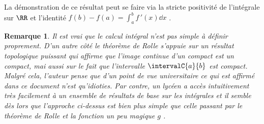 \documentclass[12pt]{amsart}
\newtheorem*{remark*}{Remarque}
\begin{document}
La démonstration de ce résultat peut se faire via la stricte positivité de l'intégrale sur $\RR$ et l'identité $f(b) - f(a) = \int_a^b f\,'(x) \dd{x}$ .


\begin{remark*}
	Il est vrai que le calcul intégral n'est pas simple à définir proprement.
	D'un autre côté le théorème de Rolle s'appuie sur un résultat topologique puissant qui affirme que l'image continue d'un compact est un compact, mai aussi sur le fait que l'intervalle $\intervalC{a}{b}$ est compact.
	Malgré cela, l'auteur pense que d'un point de vue universitaire ce qui est affirmé dans ce document n'est qu'idioties.
	Par contre, un lycéen a accès intuitivement très facilement à un ensemble de résultats de base sur les intégrales et il semble dès lors que l'approche ci-dessus est bien plus simple que celle passant par le théorème de Rolle et la fonction un peu magique $g$ .
\end{remark*}
\end{document}
